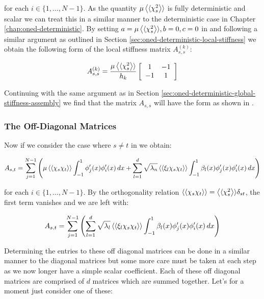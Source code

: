 for each $i \in \{1,\ldots,N-1\}$. As the quantity $\mu\left\langle\langle\chi_s^2\right\rangle\rangle$ is
fully deterministic and scalar we can treat this in a similar manner to the
deterministic case in  Chapter \ref{chap:oned-deterministic}. By setting $a =
\mu\left\langle\langle\chi_s^2\right\rangle\rangle, b = 0, c = 0$ in 
and following a similar argument as outlined in Section
\ref{sec:oned-deterministic-local-stiffness} we obtain the following form of
the local stiffness matrix $A_{s,s}^{(k)}$:

\begin{equation}\label{eq:oned-stochasic-local-stifness-diag}
    A_{s,s}^{(k)} = \frac{\mu\left\langle\langle\chi_s^2\right\rangle\rangle}{h_k}\left[\begin{array}{c c}
                1 & -1 \\ -1 & 1
              \end{array}\right]
\end{equation}

Continuing with the same argument as in Section
\ref{sec:oned-deterministic-global-stiffness-assembly} we find that the matrix
$A_{s,s}$ will have the form as shown in
.

\subsubsection{The Off-Diagonal Matrices}

Now if we consider the case where $s \neq t$ in
 we obtain:

\begin{equation}\label{eq:oned-stochastic-off-diagonal-stiffness}
    A_{s,t} = \sum_{j=1}^{N - 1}\left(\mu\left\langle\langle\chi_s\chi_t\right\rangle\rangle
        \int_{-1}^1 \phi_j'(x)\phi_i'(x)\, dx
       + \sum_{l=1}^d\sqrt{\lambda_n}\left\langle\langle\xi_l\chi_s\chi_t\right\rangle\rangle
       \int_{-1}^1 \beta_l(x)\phi_j'(x)\phi_i'(x)\, dx\right)
\end{equation}

for each $i \in \{1,\ldots,N-1\}$. By the orthogonality relation
$\left\langle\langle\chi_s\chi_t\right\rangle\rangle = \left\langle\langle\chi_s^2\right\rangle\rangle\delta_{st}$, the first term vanishes
and we are left with:

\begin{equation}
    A_{s,t} = \sum_{j=1}^{N - 1}\left(
        \sum_{l=1}^d\sqrt{\lambda_l}\left\langle\langle\xi_l\chi_s\chi_t\right\rangle\rangle
            \int_{-1}^1\beta_l(x)\phi_j'(x)\phi_i'(x)\, dx\right)
\end{equation}

Determining the entries to these off diagonal matrices can be done in a similar
manner to the diagonal matrices but some more care must be taken at each step
as we now longer have a simple scalar coefficient. Each of these off diagonal
matrices are comprised of $d$ matrices which are summed together. Let's for a
moment just consider one of these:

